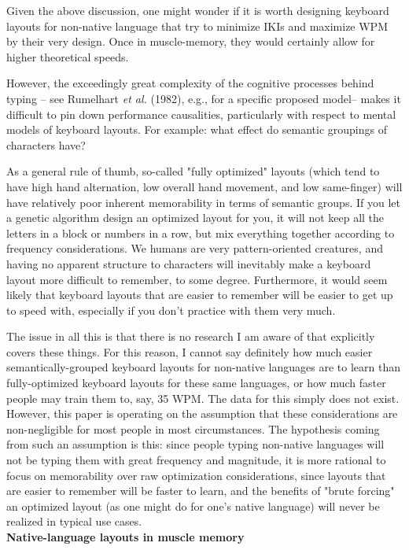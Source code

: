 \documentclass[11pt]{article}
\begin{document}
Given the above discussion, one might wonder if it is worth designing keyboard layouts for non-native language that try to minimize IKIs and maximize WPM by their very design. Once in muscle-memory, they would certainly allow for higher theoretical speeds.

However, the exceedingly great complexity of the cognitive processes behind typing -- see Rumelhart \emph{et al.} (1982), e.g., for a specific proposed model-- makes it difficult to pin down performance causalities, particularly with respect to mental models of keyboard layouts. For example: what effect do semantic groupings of characters have?

As a general rule of thumb, so-called "fully optimized" layouts (which tend to have high hand alternation, low overall hand movement, and low same-finger) will have relatively poor inherent memorability in terms of semantic groups. If you let a genetic algorithm design an optimized layout for you, it will not keep all the letters in a block or numbers in a row, but mix everything together according to frequency considerations. We humans are very pattern-oriented creatures, and having no apparent structure to characters will inevitably make a keyboard layout more difficult to remember, to some degree. Furthermore, it would seem likely that keyboard layouts that are easier to remember will be easier to get up to speed with, especially if you don't practice with them very much.

The issue in all this is that there is no research I am aware of that explicitly covers these things. For this reason, I cannot say definitely how much easier semantically-grouped keyboard layouts for non-native languages are to learn than fully-optimized keyboard layouts for these same languages, or how much faster people may train them to, say, 35 WPM. The data for this simply does not exist. However, this paper is operating on the assumption that these considerations are non-negligible for most people in most circumstances. The hypothesis coming from such an assumption is this: since people typing non-native languages will not be typing them with great frequency and magnitude, it is more rational to focus on memorability over raw optimization considerations, since layouts that are easier to remember will be faster to learn, and the benefits of "brute forcing" an optimized layout (as one might do for one's native language) will never be realized in typical use cases. \\

\noindent \textbf{Native-language layouts in muscle memory} \\
\end{document}
